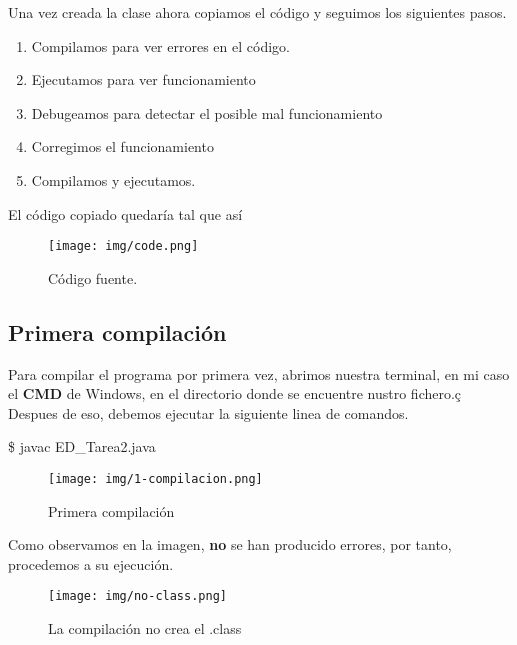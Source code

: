 \documentclass{article}
\begin{document}
  \newpage
    Una vez creada la clase ahora copiamos el código y seguimos los siguientes pasos.

    \begin{enumerate}
      \item Compilamos para ver errores en el código.
      \item Ejecutamos para ver funcionamiento
      \item Debugeamos para detectar el posible mal funcionamiento
      \item Corregimos el funcionamiento
      \item Compilamos y ejecutamos.
    \end{enumerate}

    El código copiado quedaría tal que así
    \begin{figure}[h]
      \centering
      \texttt{[image: img/code.png]}
      \caption{Código fuente.}
    \end{figure}

  \newpage
    \subsection{Primera compilación}
      Para compilar el programa por primera vez, abrimos nuestra terminal, en mi caso el \textbf{CMD} de Windows, en el directorio donde se encuentre nustro fichero.ç
      Despues de eso, debemos ejecutar la siguiente linea de comandos.
      \begin{listing}[style=consola, numbers=none]
      \$ javac ED_Tarea2.java 
      \end{listing}
      \begin{figure}[h]
        \centering
        \texttt{[image: img/1-compilacion.png]}
        \caption{Primera compilación}
      \end{figure}
      Como observamos en la imagen, \textbf{no} se han producido errores, por tanto, procedemos a su ejecución.
      \begin{figure}[h]
        \centering
        \texttt{[image: img/no-class.png]}
        \caption{La compilación no crea el .class}
      \end{figure}

  \newpage
\end{document}
